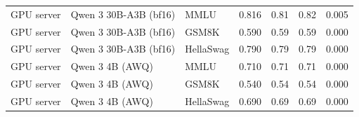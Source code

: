\begin{longtable}{@{}l l l r r r r@{}}
GPU server & Qwen 3 30B-A3B (bf16) & MMLU & 0.816 & 0.81 & 0.82 & 0.005 \\
GPU server & Qwen 3 30B-A3B (bf16) & GSM8K & 0.590 & 0.59 & 0.59 & 0.000 \\
GPU server & Qwen 3 30B-A3B (bf16) & HellaSwag & 0.790 & 0.79 & 0.79 & 0.000 \\
GPU server & Qwen 3 4B (AWQ) & MMLU & 0.710 & 0.71 & 0.71 & 0.000 \\
GPU server & Qwen 3 4B (AWQ) & GSM8K & 0.540 & 0.54 & 0.54 & 0.000 \\
GPU server & Qwen 3 4B (AWQ) & HellaSwag & 0.690 & 0.69 & 0.69 & 0.000 \\
\end{longtable}
